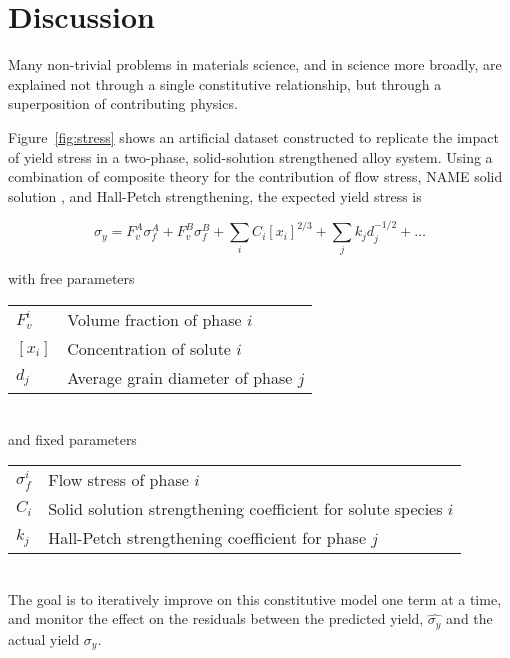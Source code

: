 \section{Discussion}\label{discussion}

Many non-trivial problems in materials science, and in science more broadly, are explained not through a single constitutive relationship, but through a superposition of contributing physics. 

Figure~\ref{fig:stress} shows an artificial dataset constructed to replicate the impact of yield stress in a two-phase, solid-solution strengthened alloy system. Using a combination of composite theory for the contribution of flow stress, {\color{red} NAME} solid solution \cite{solid solution}, and Hall-Petch \cite{Hall-Petch} strengthening, the expected yield stress is

\begin{equation}
	\sigma_y = F_v^A \sigma_f^A + F_v^B \sigma_f^B + \sum_i C_i [x_i]^{2/3} + \sum_j k_j d_j^{-1/2} + \ldots
\end{equation}

\noindent with free parameters \\[2ex]
\begin{tabular}{l l}
	$F_v^i$	& Volume fraction of phase $i$ \\
	$[x_i]$	& Concentration of solute $i$ \\
	$d_j$	& Average grain diameter of phase $j$
\end{tabular}
\\[2ex]
\noindent and fixed parameters \\[2ex]
\begin{tabular}{l l}
	$\sigma_f^i$	& Flow stress of phase $i$ \\
	$C_i$		& Solid solution strengthening coefficient for solute species $i$ \\
	$k_j$		& Hall-Petch strengthening coefficient for phase $j$
\end{tabular}
\\[2ex]

The goal is to iteratively improve on this constitutive model one term at a time, and monitor the effect on the residuals between the predicted yield, $\hat{\sigma_y}$ and the actual yield $\sigma_y$.

